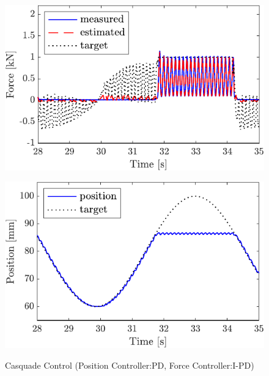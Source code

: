 \begin{figure}[t]
    \begin{minipage}{\minipageratio\hsize}
    \centering
        \includegraphics[keepaspectratio, scale = \minifigscale]{contents/IntegrationControl/figure/SECASQ/crop-FBcsqtch_IPD_Notrq_posPIDadjust_force.pdf}
        \label{fig5:crop-FBcsqtch_IPD_Notrq_posPIDadjust_force}
    \end{minipage}
    \begin{minipage}{\minipageratio\hsize}
    \centering
        \includegraphics[keepaspectratio, scale = \minifigscale]{contents/IntegrationControl/figure/SECASQ/crop-FBcsqtch_IPD_Notrq_posPIDadjust_pos.pdf}
        \label{fig5:crop-FBcsqtch_IPD_Notrq_posPIDadjust_pos}
    \end{minipage}
    \caption{Casquade Control (Position Controller:PD, Force Controller:I-PD)}  
    \label{fig5:crop-FBcsqtch_IPD_Notrq_posPIDadjust}
\end{figure}

